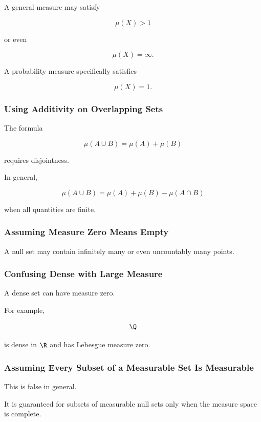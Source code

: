 A general measure may satisfy

\[
\mu(X)>1
\]

or even

\[
\mu(X)=\infty.
\]

A probability measure specifically satisfies

\[
\mu(X)=1.
\]

\subsubsection{Using Additivity on Overlapping Sets}

The formula

\[
\mu(A\cup B)
=
\mu(A)+\mu(B)
\]

requires disjointness.

In general,

\[
\boxed{
\mu(A\cup B)
=
\mu(A)+\mu(B)-\mu(A\cap B)
}
\]

when all quantities are finite.

\subsubsection{Assuming Measure Zero Means Empty}

A null set may contain infinitely many or even uncountably many points.

\subsubsection{Confusing Dense with Large Measure}

A dense set can have measure zero.

For example,

\[
\Q
\]

is dense in \(\R\) and has Lebesgue measure zero.

\subsubsection{Assuming Every Subset of a Measurable Set Is Measurable}

This is false in general.

It is guaranteed for subsets of measurable null sets only when the measure
space is complete.

